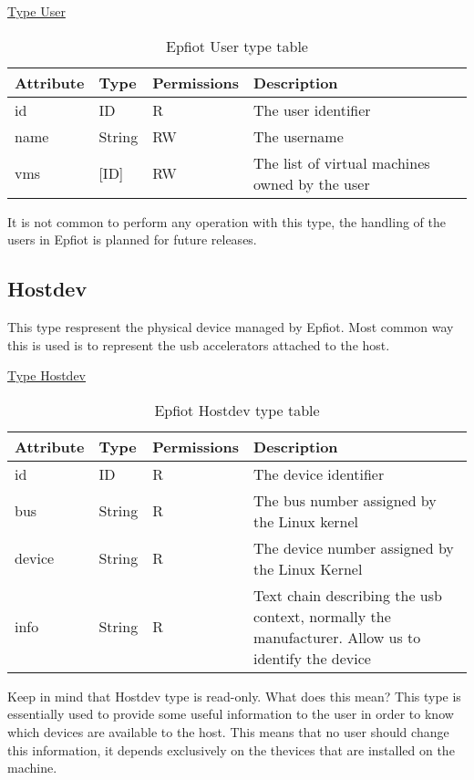 \underline{Type User}
\begin{table}[H]
\begin{center}
\begin{tabular}[b]{|l|l|l|l|}
    \hline
    Attribute & Type & Permissions & Description \\
    \hline
    id & ID & R & The user identifier \\
    name & String & RW & The username\\
    vms & [ID] & RW & The list of virtual machines owned by the user\\
    \hline
\end{tabular}
\caption{Epfiot User type table}
\label{table1}
\end{center}
\end{table}

It is not common to perform any operation with this type, the handling of the users in Epfiot is planned for future releases.

\subsection{Hostdev}
\label{makereference5.1.2}

This type respresent the physical device managed by Epfiot. Most common way this is used is to represent the usb accelerators attached to the host.

\underline{Type Hostdev}
\begin{table}[H]
\begin{center}
\begin{tabular}[b]{|l|l|l|p{11cm}|}
    \hline
    Attribute & Type & Permissions & Description \\
    \hline
    id & ID & R & The device identifier \\
    \hline
    bus & String & R & The bus number assigned by the Linux kernel\\
    \hline
    device & String & R & The device number assigned by the Linux Kernel\\
    \hline
    info & String & R & Text chain describing the usb context, normally the manufacturer. Allow us to identify the device\\
    \hline
\end{tabular}
\caption{Epfiot Hostdev type table}
\label{table1}
\end{center}
\end{table}

Keep in mind that Hostdev type is read-only. What does this mean? This type is essentially used to provide some useful information to the user in order to know which devices are available to the host.
This means that no user should change this information, it depends exclusively on the thevices that are installed on the machine.


